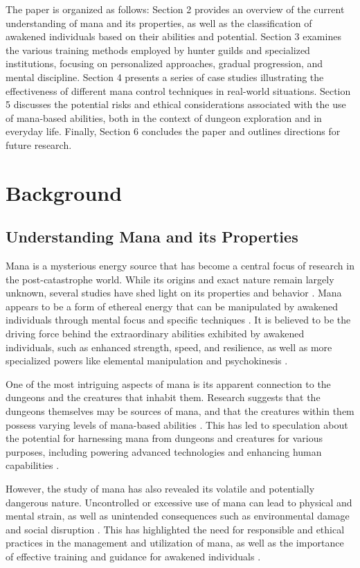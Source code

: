 \documentclass[12pt, a4paper]{article}
\begin{document}
The paper is organized as follows: Section 2 provides an overview of the current understanding of mana and its properties, as well as the classification of awakened individuals based on their abilities and potential. Section 3 examines the various training methods employed by hunter guilds and specialized institutions, focusing on personalized approaches, gradual progression, and mental discipline. Section 4 presents a series of case studies illustrating the effectiveness of different mana control techniques in real-world situations. Section 5 discusses the potential risks and ethical considerations associated with the use of mana-based abilities, both in the context of dungeon exploration and in everyday life. Finally, Section 6 concludes the paper and outlines directions for future research.

\section{Background}
\subsection{Understanding Mana and its Properties}
Mana is a mysterious energy source that has become a central focus of research in the post-catastrophe world. While its origins and exact nature remain largely unknown, several studies have shed light on its properties and behavior \cite{Nakano2026, Sato2026}. Mana appears to be a form of ethereal energy that can be manipulated by awakened individuals through mental focus and specific techniques \cite{Watanabe2026}. It is believed to be the driving force behind the extraordinary abilities exhibited by awakened individuals, such as enhanced strength, speed, and resilience, as well as more specialized powers like elemental manipulation and psychokinesis \cite{Kowalczyk2026}.

One of the most intriguing aspects of mana is its apparent connection to the dungeons and the creatures that inhabit them. Research suggests that the dungeons themselves may be sources of mana, and that the creatures within them possess varying levels of mana-based abilities \cite{Nowak2026}. This has led to speculation about the potential for harnessing mana from dungeons and creatures for various purposes, including powering advanced technologies and enhancing human capabilities \cite{Adesina2027}.

However, the study of mana has also revealed its volatile and potentially dangerous nature. Uncontrolled or excessive use of mana can lead to physical and mental strain, as well as unintended consequences such as environmental damage and social disruption \cite{Hofstede2027}. This has highlighted the need for responsible and ethical practices in the management and utilization of mana, as well as the importance of effective training and guidance for awakened individuals \cite{Muller2027}.
\end{document}
